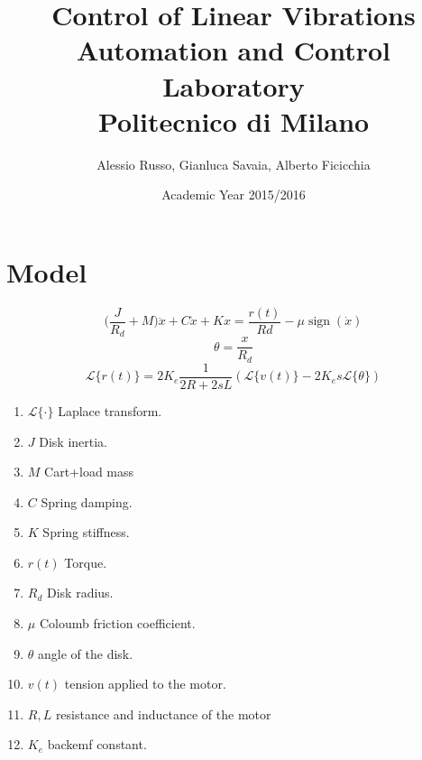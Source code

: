 \documentclass[10pt,a4paper]{report}
\author{Alessio Russo, Gianluca Savaia, Alberto Ficicchia}
\title{Control of Linear Vibrations \\
\Large Automation and Control Laboratory \\
 Politecnico di Milano}
\date{Academic Year 2015/2016}
\DeclareMathOperator{\sign}{sign}
\begin{document}
\maketitle
\tableofcontents
\chapter{Model}
$$\Big(\frac{J}{R_d}+M\Big)\ddot{x} + C\dot{x}+Kx = \frac{r(t)}{Rd} - \mu \sign(\dot{x})$$
$$\theta = \frac{x}{R_d}$$
$$\mathcal{L}\{r(t)\} = 2K_e \frac{1}{2R+2sL} (\mathcal{L}\{ v(t)\}-2K_e s \mathcal{L}\{\theta \})$$
\begin{enumerate}
\item $\mathcal{L}\{\cdot \}$ Laplace transform.
\item $J$ Disk inertia.
\item $M$ Cart+load mass
\item $C$ Spring damping.
\item $K$ Spring stiffness.
\item $r(t)$ Torque.
\item $R_d$ Disk radius.
\item $\mu$ Coloumb friction coefficient.
\item $\theta$ angle of the disk.
\item $v(t)$ tension applied to the motor.
\item $R,L$ resistance and inductance of the motor
\item $K_e$ backemf constant.

\end{enumerate}
\end{document}
